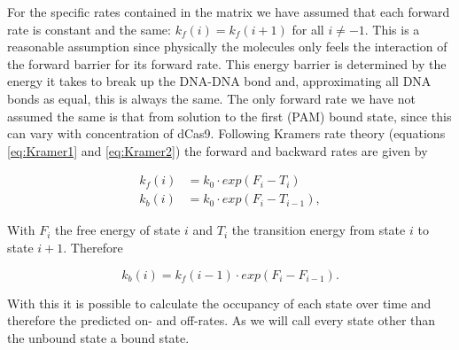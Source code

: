 For the specific rates contained in the matrix we have assumed that each forward rate is constant and the same: $k_f(i) = k_f(i+1)$ for all $i \neq -1$. This is a reasonable assumption since physically the molecules only feels the interaction of the forward barrier for its forward rate. This energy barrier is determined by the energy it takes to break up the DNA-DNA bond and, approximating all DNA bonds as equal, this is always the same. The only forward rate we have not assumed the same is that from solution to the first (PAM) bound state, since this can vary with concentration of dCas9.
Following Kramers rate theory (equations \ref{eq:Kramer1} and \ref{eq:Kramer2}) the forward and backward rates are given by

\begin{align*}
k_f(i) &= k_0 \cdot exp(F_i - T_i) \\
k_b(i) &= k_0 \cdot exp(F_i - T_{i-1}),
\end{align*}

With $F_i$ the free energy of state $i$ and $T_i$ the transition energy from state $i$ to state $i+1$. Therefore

\begin{equation}
k_b(i) = k_f(i-1) \cdot exp(F_{i}-F_{i-1}).
\end{equation}

With this it is possible to calculate the occupancy of each state over time and therefore the predicted on- and off-rates. As \cite{PNAS} we will call every state other than the unbound state a bound state.